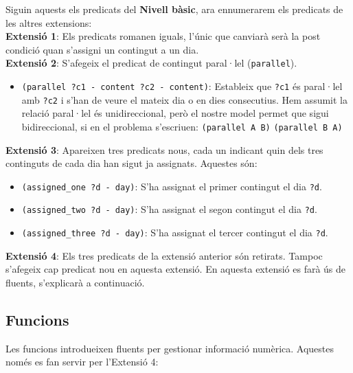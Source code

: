 \documentclass[a4paper]{article}
\begin{document}
	\noindent Siguin aquests els predicats del \textbf{Nivell bàsic}, ara ennumerarem els predicats de les altres extensions: \\
	
	\noindent \textbf{Extensió 1}: Els predicats romanen iguals, l'únic que canviarà serà la post condició quan s'assigni un contingut a un dia. \\
	
	\noindent \textbf{Extensió 2}: S'afegeix el predicat de contingut paral·lel (\texttt{parallel}).
	
	\begin{itemize}
		\item \texttt{(parallel ?c1 - content ?c2 - content)}: Estableix que \texttt{?c1} és paral·lel amb \texttt{?c2} i s'han de veure el mateix dia o en dies consecutius. Hem assumit la relació paral·lel és unidireccional, però el nostre model permet que sigui bidireccional, si en el problema s'escriuen: \newline
		\texttt{(parallel A B)} \newline
		\texttt{(parallel B A)}
	\end{itemize}
	
	\noindent \textbf{Extensió 3}: Apareixen tres predicats nous, cada un indicant quin dels tres continguts de cada dia han sigut ja assignats. Aquestes són:
	
	\begin{itemize}
		\item \texttt{(assigned\_one ?d - day)}: S'ha assignat el primer contingut el dia \texttt{?d}.
		\item \texttt{(assigned\_two ?d - day)}: S'ha assignat el segon contingut el dia \texttt{?d}.
		\item \texttt{(assigned\_three ?d - day)}: S'ha assignat el tercer contingut el dia \texttt{?d}.
	\end{itemize}
	
	\noindent \textbf{Extensió 4}: Els tres predicats de la extensió anterior són retirats. Tampoc s'afegeix cap predicat nou en aquesta extensió. En aquesta extensió es farà ús de fluents, s'explicarà a continuació.
	
	\subsection{Funcions}
	
	Les funcions introdueixen fluents per gestionar informació numèrica. Aquestes només es fan servir per l'Extensió 4:
	
\end{document}
